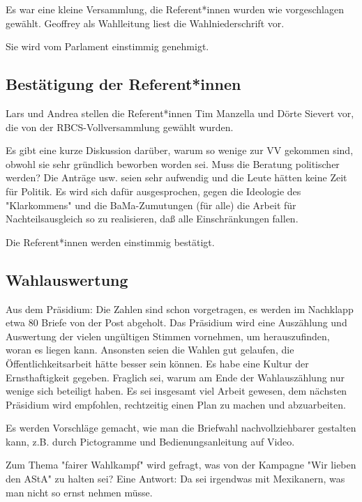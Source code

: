 \documentclass[ngerman,headheight=70pt]{scrartcl}
\begin{document}
    Es war eine kleine Versammlung, die Referent*innen wurden wie vorgeschlagen
    gewählt. Geoffrey als Wahlleitung liest die Wahlniederschrift vor.

    Sie wird vom Parlament einstimmig genehmigt.

    \subsection{Bestätigung der Referent*innen}

    Lars und Andrea stellen die Referent*innen Tim Manzella und Dörte Sievert vor,
    die von der RBCS-Vollversammlung gewählt wurden.

    Es gibt eine kurze Diskussion darüber, warum so wenige zur VV gekommen sind,
    obwohl sie sehr gründlich beworben worden sei. Muss die Beratung politischer
    werden? Die Anträge usw. seien sehr aufwendig und die Leute hätten keine Zeit
    für Politik. Es wird sich dafür ausgesprochen, gegen die Ideologie des
    "Klarkommens" und die BaMa-Zumutungen (für alle) die Arbeit für
    Nachteilsausgleich so zu realisieren, daß alle Einschränkungen fallen.

    Die Referent*innen werden einstimmig bestätigt.

    \subsection{Wahlauswertung}

    Aus dem Präsidium: Die Zahlen sind schon vorgetragen, es werden im Nachklapp
    etwa 80 Briefe von der Post abgeholt. Das Präsidium wird eine Auszählung und
    Auswertung der vielen ungültigen Stimmen vornehmen, um herauszufinden, woran
    es liegen kann. Ansonsten seien die Wahlen gut gelaufen, die
    Öffentlichkeitsarbeit hätte besser sein können. Es habe eine Kultur der
    Ernsthaftigkeit gegeben. Fraglich sei, warum am Ende der Wahlauszählung nur
    wenige sich beteiligt haben. Es sei insgesamt viel Arbeit gewesen, dem
    nächsten Präsidium wird empfohlen, rechtzeitig einen Plan zu machen und
    abzuarbeiten.

    Es werden Vorschläge gemacht, wie man die Briefwahl nachvollziehbarer
    gestalten kann, z.B. durch Pictogramme und Bedienungsanleitung auf Video.

    Zum Thema "fairer Wahlkampf" wird gefragt, was von der Kampagne "Wir lieben
    den AStA" zu halten sei? Eine Antwort: Da sei irgendwas mit Mexikanern, was
    man nicht so ernst nehmen müsse.
\end{document}
